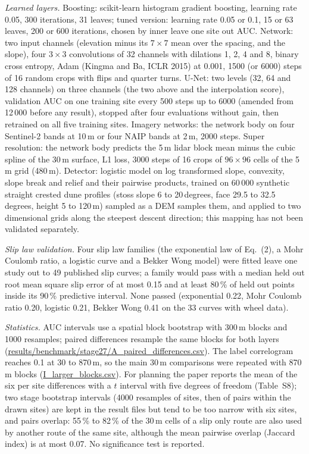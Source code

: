 \documentclass[10pt]{article}
\begin{document}
\textit{Learned layers.} Boosting: scikit-learn histogram gradient boosting, learning rate 0.05, 300 iterations, 31 leaves; tuned version: learning rate 0.05 or 0.1, 15 or 63 leaves, 200 or 600 iterations, chosen by inner leave one site out AUC. Network: two input channels (elevation minus its $7\times7$ mean over the spacing, and the slope), four $3\times3$ convolutions of 32 channels with dilations 1, 2, 4 and 8, binary cross entropy, Adam (Kingma and Ba, ICLR 2015) at 0.001, 1500 (or 6000) steps of 16 random crops with flips and quarter turns. U-Net: two levels (32, 64 and 128 channels) on three channels (the two above and the interpolation score), validation AUC on one training site every 500 steps up to 6000 (amended from 12\,000 before any result), stopped after four evaluations without gain, then retrained on all five training sites. Imagery networks: the network body on four Sentinel-2 bands at 10\,m or four NAIP bands at 2\,m, 2000 steps. Super resolution: the network body predicts the 5\,m lidar block mean minus the cubic spline of the 30\,m surface, L1 loss, 3000 steps of 16 crops of $96\times96$ cells of the 5\,m grid (480\,m). Detector: logistic model on log transformed slope, convexity, slope break and relief and their pairwise products, trained on 60\,000 synthetic straight crested dune profiles (stoss slope 6 to 20\,degrees, face 29.5 to 32.5\,degrees, height 5 to 120\,m) sampled as a DEM samples them, and applied to two dimensional grids along the steepest descent direction; this mapping has not been validated separately.

\textit{Slip law validation.} Four slip law families (the exponential law of Eq.~(2), a Mohr Coulomb ratio, a logistic curve and a Bekker Wong model) were fitted leave one study out to 49 published slip curves; a family would pass with a median held out root mean square slip error of at most 0.15 and at least 80\,\% of held out points inside its 90\,\% predictive interval. None passed (exponential 0.22, Mohr Coulomb ratio 0.20, logistic 0.21, Bekker Wong 0.41 on the 33 curves with wheel data).

\textit{Statistics.} AUC intervals use a spatial block bootstrap with 300\,m blocks and 1000 resamples; paired differences resample the same blocks for both layers (\url{results/benchmark/stage27/A_paired_differences.csv}). The label correlogram reaches 0.1 at 30 to 870\,m, so the main 30\,m comparisons were repeated with 870\,m blocks (\url{I_larger_blocks.csv}). For planning the paper reports the mean of the six per site differences with a $t$ interval with five degrees of freedom (Table~S8); two stage bootstrap intervals (4000 resamples of sites, then of pairs within the drawn sites) are kept in the result files but tend to be too narrow with six sites, and pairs overlap: 55\,\% to 82\,\% of the 30\,m cells of a slip only route are also used by another route of the same site, although the mean pairwise overlap (Jaccard index) is at most 0.07. No significance test is reported.
\end{document}
